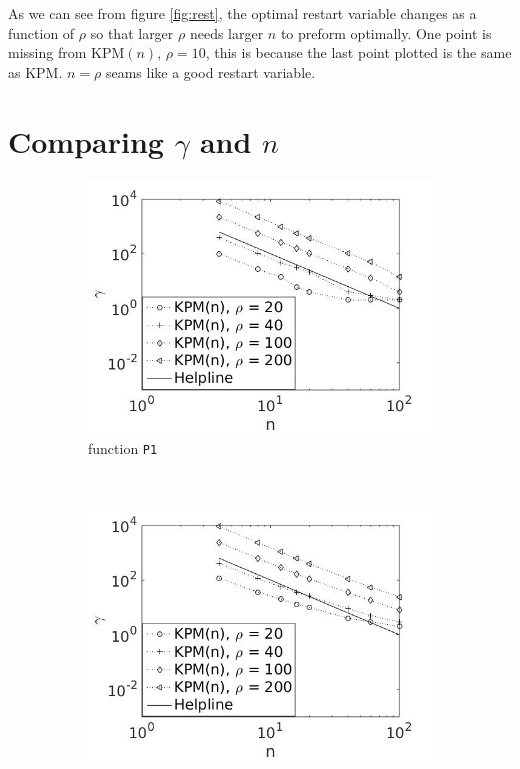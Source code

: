 As we can see from figure \ref{fig:rest}, the optimal restart variable changes as a function of $\rho$ so that larger $\rho$ needs larger $n$ to preform optimally. One point is missing from KPM$(n)$, $\rho = 10$, this is because the last point plotted is the same as KPM. $n = \rho$ seams like a good restart variable.
\section{Comparing $\gamma$ and $n$} \label{sec:rrest}
\begin{figure}[H]
        \centering
        \begin{subfigure}[b]{0.45\textwidth}
                \includegraphics[width=\textwidth]{fig/s3antvsm1}
                \caption{function \texttt{P1}}
                \label{fig:ant1}
        \end{subfigure}%
~
        \begin{subfigure}[b]{0.45\textwidth}
                \includegraphics[width=\textwidth]{fig/s4antvsm2}

\end{subfigure}
\end{figure}
